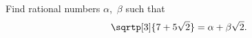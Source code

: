 Find rational numbers $\alpha$,~$\beta$ such that
\[
\sqrtp[3]{7 + 5\sqrt{2}} = \alpha + \beta\sqrt{2}.
\]

